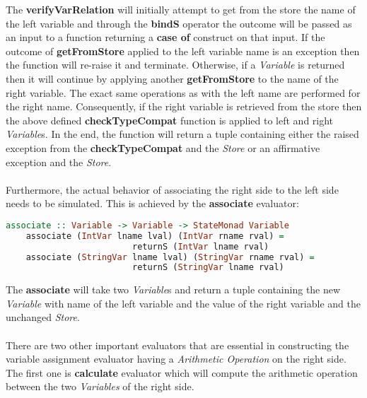 \documentclass[a4paper, onecolumn]{article}
\begin{document}
    \noindent The \textbf{verifyVarRelation} will initially attempt to get from the store the name of the left variable and through the \textbf{bindS} operator the outcome will be passed as an input to a function returning a \textbf{case of} construct on that input. If the outcome of \textbf{getFromStore} applied to the left variable name is an exception then the function will re-raise it and terminate. Otherwise, if a \textit{Variable} is returned then it will continue by applying another \textbf{getFromStore} to the name of the right variable. The exact same operations as with the left name are performed for the right name. Consequently, if the right variable is retrieved from the store then the above defined \textbf{checkTypeCompat} function is applied to left and right \textit{Variable}s. In the end, the function will return a tuple containing either the raised exception from the \textbf{checkTypeCompat} and the \textit{Store} or an affirmative exception and the \textit{Store}. \\ \\
    \noindent Furthermore, the actual behavior of associating the right side to the left side needs to be simulated. This is achieved by the \textbf{associate} evaluator: 
    
    \begin{tcolorbox}
    \begin{lstlisting}[language=Haskell] 
    associate :: Variable -> Variable -> StateMonad Variable 
    associate (IntVar lname lval) (IntVar rname rval) = 
                         returnS (IntVar lname rval)
    associate (StringVar lname lval) (StringVar rname rval) =
                         returnS (StringVar lname rval)
    \end{lstlisting}
    \end{tcolorbox}
    
    \noindent The \textbf{associate} will take two \textit{Variable}s and return a tuple containing the new \textit{Variable} with name of the left variable and the value of the right variable and the unchanged \textit{Store}.  \\ \\
    There are two other important evaluators that are essential in constructing the variable assignment evaluator having a \textit{Arithmetic Operation} on the right side. The first one is \textbf{calculate} evaluator which will compute the arithmetic operation between the two \textit{Variables} of the right side.
    
\end{document}
